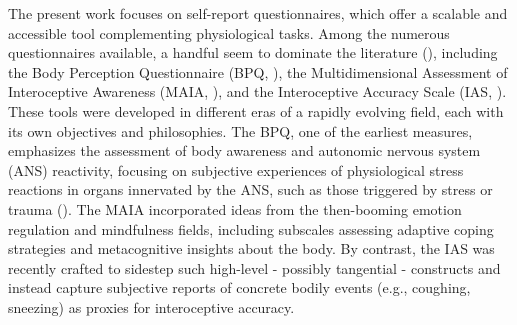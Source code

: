 \documentclass[
  jou,
  floatsintext,
  longtable,
  nolmodern,
  notxfonts,
  notimes,
  colorlinks=true,linkcolor=blue,citecolor=blue,urlcolor=blue]{apa7}
\begin{document}
The present work focuses on self-report questionnaires, which offer a
scalable and accessible tool complementing physiological tasks. Among
the numerous questionnaires available, a handful seem to dominate the
literature (),
including the Body Perception Questionnaire (BPQ,
), the
Multidimensional Assessment of Interoceptive Awareness (MAIA,
), and
the Interoceptive Accuracy Scale (IAS,
). These tools
were developed in different eras of a rapidly evolving field, each with
its own objectives and philosophies. The BPQ, one of the earliest
measures, emphasizes the assessment of body awareness and autonomic
nervous system (ANS) reactivity, focusing on subjective experiences of
physiological stress reactions in organs innervated by the ANS, such as
those triggered by stress or trauma
(). The MAIA
incorporated ideas from the then-booming emotion regulation and
mindfulness fields, including subscales assessing adaptive coping
strategies and metacognitive insights about the body. By contrast, the
IAS was recently crafted to sidestep such high-level - possibly
tangential - constructs and instead capture subjective reports of
concrete bodily events (e.g., coughing, sneezing) as proxies for
interoceptive accuracy.
\end{document}
